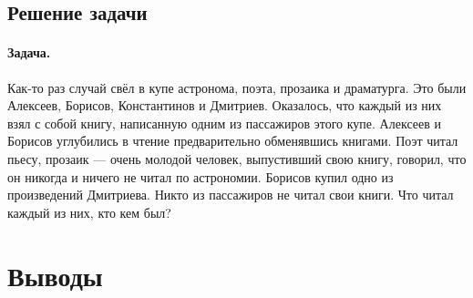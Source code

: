 \subsection{Решение задачи}

\paragraph{Задача.} Как-то раз случай свёл в купе астронома, поэта, прозаика и драматурга. Это были Алексеев,
Борисов, Константинов и Дмитриев. Оказалось, что каждый из них взял с собой книгу,
написанную одним из пассажиров этого купе. Алексеев и Борисов углубились в чтение
предварительно обменявшись книгами. Поэт читал пьесу, прозаик — очень молодой
человек, выпустивший свою книгу, говорил, что он никогда и ничего не читал по
астрономии. Борисов купил одно из произведений Дмитриева. Никто из пассажиров не
читал свои книги. Что читал каждый из них, кто кем был?

\section{Выводы}





